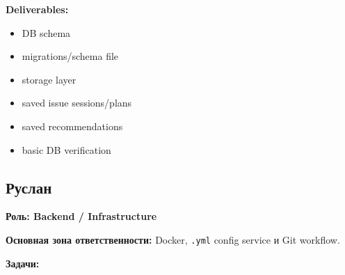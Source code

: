 \documentclass[12pt,a4paper]{article}
\begin{document}
\textbf{Deliverables:}
\begin{itemize}
    \item DB schema
    \item migrations/schema file
    \item storage layer
    \item saved issue sessions/plans
    \item saved recommendations
    \item basic DB verification
\end{itemize}

\subsection{Руслан}

\textbf{Роль: Backend / Infrastructure}

\textbf{Основная зона ответственности:} Docker, \texttt{.yml} config service и Git workflow.

\textbf{Задачи:}
\end{document}
